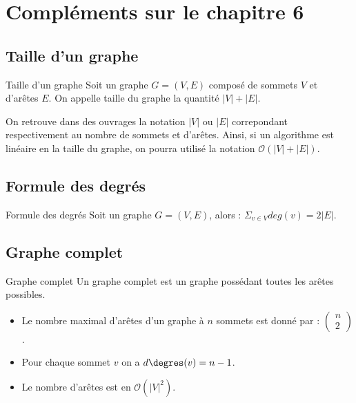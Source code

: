 \section{Compléments sur le chapitre 6}

\subsection{Taille d'un graphe}

\begin{defi}{Taille d'un graphe}
Soit un graphe $G=\left(V,E\right)$ composé de sommets $V$ et d'arêtes $E$. On appelle taille du graphe la quantité $|V|+|E|$.
\end{defi}

\begin{rem}
On retrouve dans des ouvrages la notation $|V|$ ou $|E|$ correpondant respectivement au nombre de sommets et d'arêtes. 
Ainsi, si un algorithme est linéaire en la taille du graphe, on pourra utilisé la notation $\mathcal{O}\left(|V|+|E|\right)$.
\end{rem}

\subsection{Formule des degrés}
\begin{defi}{Formule des degrés}
Soit un graphe $G=\left(V,E\right)$, alors : $\displaystyle{\Sigma_{v \in V}} deg(v) = 2|E|$.
\end{defi}

\subsection{Graphe complet}

\begin{defi}{Graphe complet}
Un graphe complet est un graphe possédant toutes les arêtes possibles. 
\end{defi}

\begin{rem}
\begin{itemize}
\item Le nombre maximal d'arêtes d'un graphe à $n$ sommets est donné par : $\begin{pmatrix} n \\ 2\end{pmatrix}$.
\item Pour chaque sommet $v$ on a $d\degres (v) = n-1$.
\item Le nombre d'arêtes est en $\mathcal{O}\left(|V|^2\right)$.
\end{itemize}
\end{rem}

